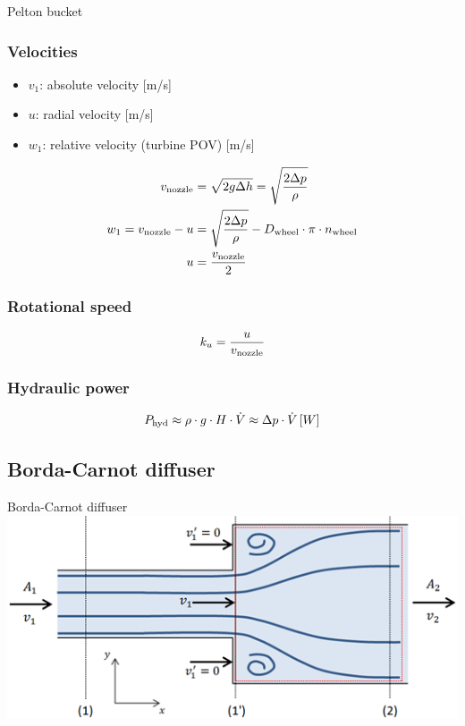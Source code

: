 \documentclass{article}
\begin{document}
\begin{multicols}{2}
\vfill
\columnbreak
\begin{theorybox}{Pelton bucket}
    \subsubsection{Velocities}
    \begin{itemize}
        \item {\color{red} $v_1$: absolute velocity} [m/s]
        \item {\color{blue} $u$: radial velocity} [m/s]
        \item {\color{darkgreen!80!black} $w_1$: relative velocity (turbine POV)} [m/s]
    \end{itemize}
    \begin{align}
        v_{\rm nozzle} &= \sqrt{2g\Delta h} = \sqrt{\frac{2\Delta p}{\rho}} \notag \\
        w_1 = v_{\rm nozzle} - u &= \sqrt{\frac{2\Delta p}{\rho}} - D_{\rm wheel}\cdot \pi \cdot n_{\rm wheel} \\
        u &= \frac{v_{\rm nozzle}}{2}
    \end{align}

    \subsubsection{Rotational speed}
    \begin{equation}
        k_u = \frac{u}{v_{\rm nozzle}}
    \end{equation}

    \subsubsection{Hydraulic power}
    \begin{equation}
        P_{\rm hyd} \approx \rho\cdot g\cdot H\cdot \dot{V} \approx \Delta p\cdot \dot{V} \left[W\right]
    \end{equation}
\end{theorybox}

\subsection{Borda-Carnot diffuser}
\begin{examplebox}{Borda-Carnot diffuser}
    \includegraphics[width=\textwidth]{media/bordaCarnot.png}


\end{examplebox}
\end{multicols}
\end{document}
